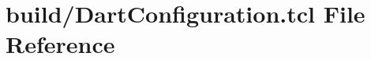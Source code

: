 \hypertarget{_dart_configuration_8tcl}{}\section{build/\+Dart\+Configuration.tcl File Reference}
\label{_dart_configuration_8tcl}
